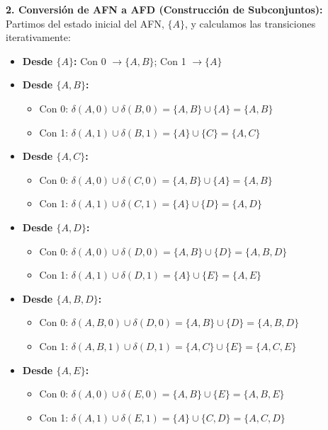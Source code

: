 \documentclass[12pt]{article}
\begin{document}
\vspace{0.5cm}

\textbf{2. Conversión de AFN a AFD (Construcción de Subconjuntos):} \\
Partimos del estado inicial del AFN, $\{A\}$, y calculamos las transiciones iterativamente:
\begin{itemize}
    \item \textbf{Desde $\{A\}$:} Con 0 $\rightarrow \{A, B\}$; Con 1 $\rightarrow \{A\}$
    \item \textbf{Desde $\{A, B\}$:}
    \begin{itemize}
        \item Con 0: $\delta(A, 0) \cup \delta(B, 0) = \{A, B\} \cup \{A\} = \{A, B\}$
        \item Con 1: $\delta(A, 1) \cup \delta(B, 1) = \{A\} \cup \{C\} = \{A, C\}$
    \end{itemize}
    \item \textbf{Desde $\{A, C\}$:}
    \begin{itemize}
        \item Con 0: $\delta(A, 0) \cup \delta(C, 0) = \{A, B\} \cup \{A\} = \{A, B\}$
        \item Con 1: $\delta(A, 1) \cup \delta(C, 1) = \{A\} \cup \{D\} = \{A, D\}$
    \end{itemize}
    \item \textbf{Desde $\{A, D\}$:}
    \begin{itemize}
        \item Con 0: $\delta(A, 0) \cup \delta(D, 0) = \{A, B\} \cup \{D\} = \{A, B, D\}$
        \item Con 1: $\delta(A, 1) \cup \delta(D, 1) = \{A\} \cup \{E\} = \{A, E\}$
    \end{itemize}
    \item \textbf{Desde $\{A, B, D\}$:}
    \begin{itemize}
        \item Con 0: $\delta(A,B, 0) \cup \delta(D, 0) = \{A, B\} \cup \{D\} = \{A, B, D\}$
        \item Con 1: $\delta(A,B, 1) \cup \delta(D, 1) = \{A, C\} \cup \{E\} = \{A, C, E\}$
    \end{itemize}
    \item \textbf{Desde $\{A, E\}$:}
    \begin{itemize}
        \item Con 0: $\delta(A, 0) \cup \delta(E, 0) = \{A, B\} \cup \{E\} = \{A, B, E\}$
        \item Con 1: $\delta(A, 1) \cup \delta(E, 1) = \{A\} \cup \{C, D\} = \{A, C, D\}$

\end{itemize}
\end{itemize}
\end{document}
